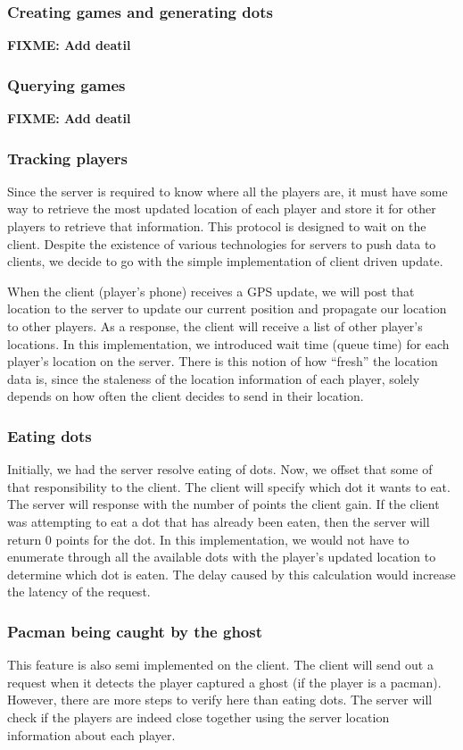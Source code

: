 \documentclass{acm_proc_article-sp}
\newcommand{\FIXME}[1]{{\color{red}\textbf{FIXME: #1}}}
\begin{document}
\subsubsection{Creating games and generating dots}
\FIXME{Add deatil}

\subsubsection{Querying games}
\FIXME{Add deatil}

\subsubsection{Tracking players}
Since the server is required to know where all the players are, it
must have some way to retrieve the most updated location of each
player and store it for other players to retrieve that
information. This protocol is designed to wait on the client. Despite
the existence of various technologies for servers to push data to
clients, we decide to go with the simple implementation of client
driven update.

When the client (player's phone) receives a GPS update, we will post
that location to the server to update our current position and
propagate our location to other players. As a response, the client
will receive a list of other player's locations. In this
implementation, we introduced wait time (queue time) for each
player's location on the server. There is this notion of how ``fresh''
the location data is, since the staleness of the location information
of each player, solely depends on how often the client decides to send
in their location.

\subsubsection{Eating dots}
Initially, we had the server resolve eating of dots. Now, we offset
that some of that responsibility to the client. The client will
specify which dot it wants to eat. The server will response with the
number of points the client gain. If the client was attempting to eat
a dot that has already been eaten, then the server will return 0
points for the dot. In this implementation, we would not have to
enumerate through all the available dots with the player's updated
location to determine which dot is eaten. The delay caused by this
calculation would increase the latency of the request.

\subsubsection{Pacman being caught by the ghost}
This feature is also semi implemented on the client. The client will
send out a request when it detects the player captured a ghost (if the
player is a pacman). However, there are more steps to verify here than
eating dots. The server will check if the players are indeed close
together using the server location information about each player.
\end{document}
